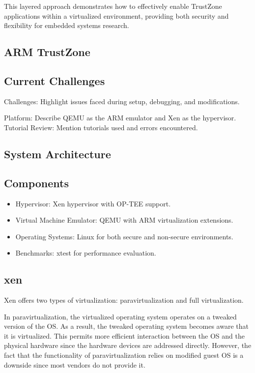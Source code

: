 \documentclass[acmtog]{acmart}
\begin{document}
This layered approach demonstrates how to effectively enable TrustZone applications within a virtualized environment, providing both security and flexibility for embedded systems research.






\subsection{ARM TrustZone}
\subsection{Current Challenges}
Challenges: Highlight issues faced during setup, debugging, and modifications.

Platform: Describe QEMU as the ARM emulator and Xen as the hypervisor.
Tutorial Review: Mention tutorials used and errors encountered.

\subsection{System Architecture}



\subsection{Components}
\begin{itemize}
  \item{Hypervisor: Xen hypervisor with OP-TEE support.}
  \item{Virtual Machine Emulator: QEMU with ARM virtualization extensions.}
  \item{Operating Systems: Linux for both secure and non-secure environments.}
  \item{Benchmarks: xtest for performance evaluation.}
\end{itemize}


\subsection{xen}
Xen offers two types of virtualization: paravirtualization and full virtualization.

In paravirtualization, the virtualized operating system operates on a tweaked version of the OS. As a result, the tweaked operating system becomes aware that it is virtualized. This permits more efficient interaction between the OS and the physical hardware since the hardware devices are addressed directly. However, the fact that the functionality of paravirtualization relies on modified guest OS is a downside since most vendors do not provide it.
\end{document}
